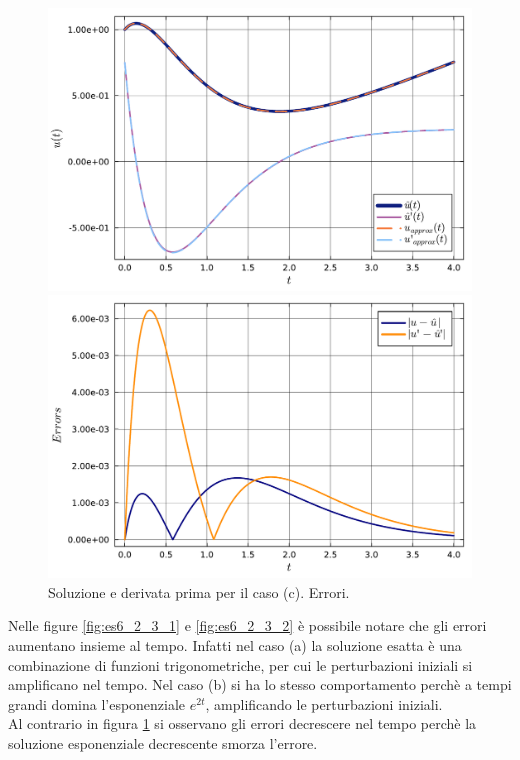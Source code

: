 \documentclass[letterpaper, 12pt]{article}
\numberwithin{equation}{section}    %
\begin{document}
\begin{figure}[!ht]
    \centering
    \begin{minipage}[b]{0.47\textwidth}
        \includegraphics[width=\textwidth]{6235.pdf}
    \end{minipage}
    \hspace{0.5cm}
    \begin{minipage}[b]{0.47\textwidth}
        \includegraphics[width=\textwidth]{6236.pdf}
    \end{minipage}
    \caption{Soluzione e derivata prima per il caso (c). Errori.}
    \label{fig:es6_2_3_3}
\end{figure}

Nelle figure \ref{fig:es6_2_3_1} e \ref{fig:es6_2_3_2} è possibile notare che gli errori aumentano insieme al 
tempo. Infatti nel caso (a) la soluzione esatta è una combinazione di funzioni trigonometriche, per cui 
le perturbazioni iniziali si amplificano nel tempo. Nel caso (b) si ha lo stesso comportamento perchè a tempi 
grandi domina l'esponenziale $e^{2t}$, amplificando le perturbazioni iniziali. \\
Al contrario in figura \ref{fig:es6_2_3_3} si osservano gli errori decrescere nel tempo perchè la 
soluzione esponenziale decrescente smorza l'errore.  
\end{document}
